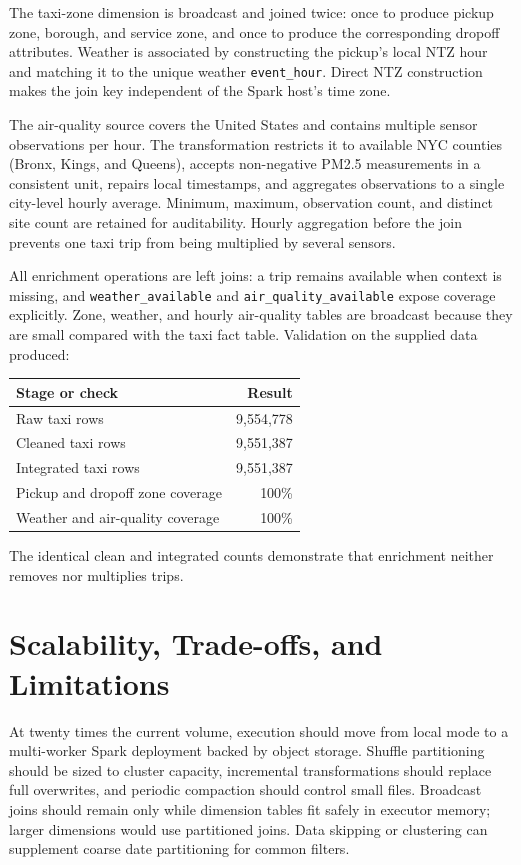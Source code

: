\documentclass[10pt,a4paper]{article}
\begin{document}
The taxi-zone dimension is broadcast and joined twice: once to produce pickup
zone, borough, and service zone, and once to produce the corresponding dropoff
attributes. Weather is associated by constructing the pickup's local NTZ hour
and matching it to the unique weather \texttt{event\_hour}. Direct NTZ
construction makes the join key independent of the Spark host's time zone.

The air-quality source covers the United States and contains multiple sensor
observations per hour. The transformation restricts it to available NYC
counties (Bronx, Kings, and Queens), accepts non-negative PM2.5 measurements in
a consistent unit, repairs local timestamps, and aggregates observations to a
single city-level hourly average. Minimum, maximum, observation count, and
distinct site count are retained for auditability. Hourly aggregation before
the join prevents one taxi trip from being multiplied by several sensors.

All enrichment operations are left joins: a trip remains available when
context is missing, and \texttt{weather\_available} and
\texttt{air\_quality\_available} expose coverage explicitly. Zone, weather,
and hourly air-quality tables are broadcast because they are small compared
with the taxi fact table. Validation on the supplied data produced:

\begin{center}
\begin{tabular}{@{}lr@{}}
\toprule
\textbf{Stage or check} & \textbf{Result} \\
\midrule
Raw taxi rows & 9,554,778 \\
Cleaned taxi rows & 9,551,387 \\
Integrated taxi rows & 9,551,387 \\
Pickup and dropoff zone coverage & 100\% \\
Weather and air-quality coverage & 100\% \\
\bottomrule
\end{tabular}
\end{center}

The identical clean and integrated counts demonstrate that enrichment neither
removes nor multiplies trips.

\section{Scalability, Trade-offs, and Limitations}

At twenty times the current volume, execution should move from local mode to a
multi-worker Spark deployment backed by object storage. Shuffle partitioning
should be sized to cluster capacity, incremental transformations should replace
full overwrites, and periodic compaction should control small files. Broadcast
joins should remain only while dimension tables fit safely in executor memory;
larger dimensions would use partitioned joins. Data skipping or clustering can
supplement coarse date partitioning for common filters.
\end{document}
